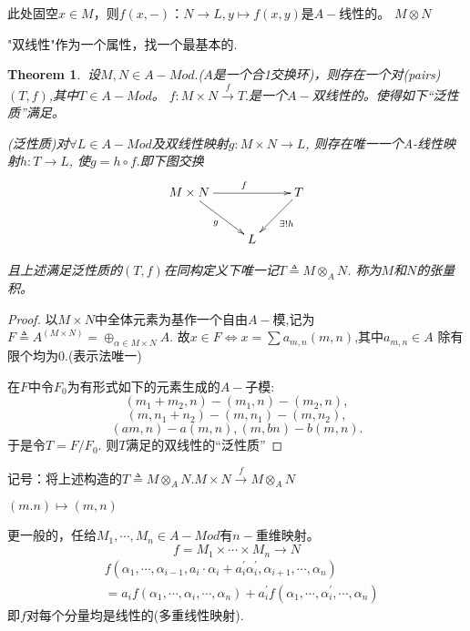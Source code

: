 \documentclass[UTF8]{article}
\newtheorem{thm}{Theorem}[section]
\begin{document}
此处固空$x \in M$，则$f(x,-)$：$N \rightarrow L,y \longmapsto f(x, y)$是$A-$线性的。
$M\otimes N$

"双线性"作为一个属性，找一个最基本的.
\begin{thm}
	

$\ $设$M,N \in A-M o d .$($A$是一个合1交换环)，则存在一个对(pairs)$(T,f)$,其中$T \in A-Mod$。
$f:M \times N \stackrel{f}{\longrightarrow} T .$是一个$A-$双线性的。使得如下“泛性质”满足。

(泛性质)对$\forall L \in A-Mod$及双线性映射$g:M \times N \rightarrow L$, 则存在唯一一个A-线性映射$h:T \rightarrow L$, 使$g=h\circ f.$即下图交换
$$
\xymatrix{
	M\times N\ar[rr]^{f}\ar[rd]_{g}& &T\ar[ld]^{\exists! h}\\
	&L&
}
$$


且上述满足泛性质的$(T,f)$在同构定义下唯一记$T \triangleq M \otimes_{A} N$. 称为$M$和$N$的张量积。
\end{thm}

\begin{proof}
	
	以$M \times N$中全体元素为基作一个自由$A-$模,记为$F\triangleq A^{(M \times N)}=\oplus_{\alpha\in M\times N}A$. 故$x\in F\Leftrightarrow x=\sum a_{m,n}(m,n)$,其中$a_{m,n}\in A$ 除有限个均为0.(表示法唯一)
	
	在$F$中令$F_0$为有形式如下的元素生成的$A-$子模:
	$$\left(m_{1}+m_{2}, n\right)-\left(m_{1}, n\right)-\left(m_{2}, n\right),$$ 
	$$\left(m, n_{1}+n_{2}\right)-\left(m, n_{1}\right)-\left(m, n_{2}\right),$$
	$$(a m,n)-a(m,n),(m,bn)-b(m,n).$$
	于是令$T=F / F_{0}.$
	则$T$满足的双线性的“泛性质”
\end{proof}
记号：将上述构造的$T \triangleq M \otimes_{A} N .$\qquad$M\times N\xrightarrow{f}M \otimes_{A} N$

\qquad\qquad\qquad\qquad\qquad\qquad\qquad\qquad\qquad$(m.n)\mapsto (m,n)$

更一般的，任给$M_{1}, \cdots, M_{n} \in A-Mod$有$n-$重维映射。
\[
f=M_{1} \times \cdots \times M_{n} \rightarrow N
\]
$$
\begin{aligned}
&f\left(\alpha_{1},\cdots,\alpha_{i-1},a_{i} \cdot \alpha_{i}+a_{i}^{\prime} \alpha_{i}^{\prime},\alpha_{i+1}, \cdots, \alpha_{n}\right)
\\
&=a_{i}f(\alpha_{1}, \cdots ,\alpha_{i}, \cdots, \alpha_{n})+a_{i}^{\prime} f\left(\alpha_{1} ,\cdots, \alpha_{i}^{\prime} ,\cdots ,\alpha_{n}\right)
\end{aligned}$$
即$f$对每个分量均是线性的(多重线性映射).
\end{document}
